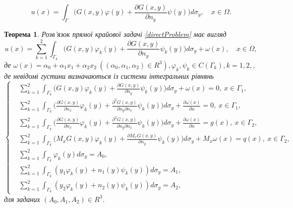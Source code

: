 \documentclass[12pt]{report}
\newtheorem{theorem}{Теорема}
\begin{document}
\begin{equation}
	 	u(x)=\int_{\Gamma}\bigg(G(x,y)\varphi(y)+\frac{\partial G(x,y)}{\partial n_y}\psi(y)\bigg)d\sigma_y, \quad x\in \Omega. \nonumber
\end{equation}

\begin{theorem}
Розв'язок прямої крайової задачі \eqref{directProblem} має вигляд
	 \begin{equation}
	 	u(x)=\sum_{k=1}^{2}\int_{\Gamma_k}\bigg(G(x,y)\varphi_k(y)+\frac{\partial G(x,y)}{\partial n_y}\psi_k(y)\bigg)d\sigma_y+\omega(x), \quad x\in \Omega,
	 \end{equation}
	 де $\omega(x) = \alpha_0+\alpha_1x_1+\alpha_2x_2 \ ((\alpha_0,\alpha_1,\alpha_2)\in R^3), \varphi_k,\psi_k\in C(\Gamma_k), k=1,2,$, де невідомі густини визначаються із системи інтегральних рівнянь
	 \begin{equation}
	 \left\{
	 	\begin{split}
		\label{system}
	 		&\sum_{k=1}^{2}\int_{\Gamma_k}\bigg(G(x,y)\varphi_k(y)+\frac{\partial G(x,y)}{\partial n_y}\psi_k(y)\bigg)d\sigma_y+\omega(x)=0, \ x\in\Gamma_1, \\
			&\sum_{k=1}^{2}\int_{\Gamma_k}\bigg(\frac{\partial G(x,y)}{\partial n_x}\varphi_k(y)+\frac{\partial^2 G(x,y)}{\partial n_y\partial n_x}\psi_k(y)\bigg)d\sigma_y+\frac{\partial\omega(x)}{\partial n}=0, \ x\in\Gamma_1, \\
			&\sum_{k=1}^{2}\int_{\Gamma_k}\bigg(\frac{\partial G(x,y)}{\partial n_x}\varphi_k(y)+\frac{\partial^2 G(x,y)}{\partial n_y\partial n_x}\psi_k(y)\bigg)d\sigma_y+\frac{\partial\omega(x)}{\partial n}=g(x), \ x\in\Gamma_2, \\
			&\sum_{k=1}^{2}\int_{\Gamma_k}\bigg(M_x G(x,y)\varphi_k(y)+\frac{\partial M_x G(x,y)}{\partial n_y}\psi_k(y)\bigg)d\sigma_y+M_x\omega(x)=q(x), \ x\in\Gamma_2, \\
			&\sum_{k=1}^{2}\int_{\Gamma_k}\varphi_k(y)d\sigma_y=A_0, \\
			&\sum_{k=1}^{2}\int_{\Gamma_k}(y_1\varphi_k(y)+n_1(y)\psi_k(y))d\sigma_y=A_1, \\
			&\sum_{k=1}^{2}\int_{\Gamma_k}(y_2\varphi_k(y)+n_2(y)\psi_k(y))d\sigma_y=A_2,
		\end{split}
	\right.
	 \end{equation}
	для заданих $(A_0,A_1,A_2)\in R^3$.
 \end{theorem}
\end{document}
